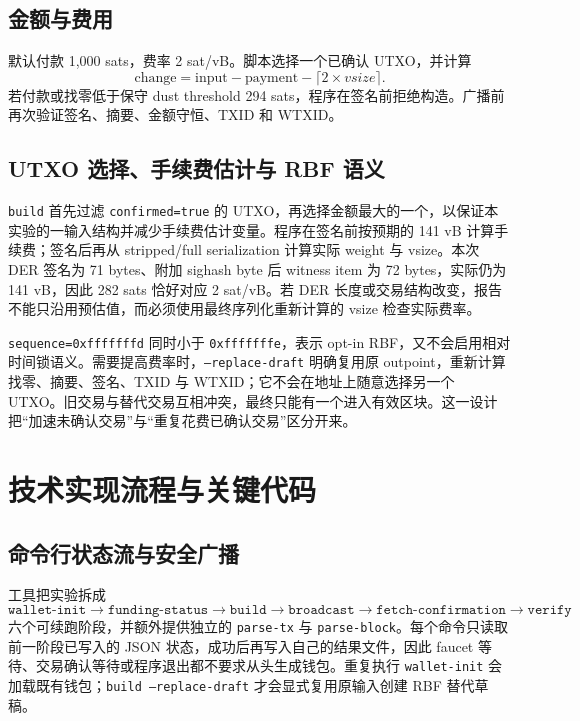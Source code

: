 \documentclass[11pt,a4paper,fontset=none]{ctexart}
\begin{document}
\subsection{金额与费用}

默认付款 1,000 sats，费率 2 sat/vB。脚本选择一个已确认 UTXO，并计算
\[
\text{change}=\text{input}-\text{payment}-\lceil 2\times vsize\rceil.
\]
若付款或找零低于保守 dust threshold 294 sats，程序在签名前拒绝构造。广播前再次验证签名、摘要、金额守恒、TXID 和 WTXID。

\subsection{UTXO 选择、手续费估计与 RBF 语义}

\texttt{build} 首先过滤 \texttt{confirmed=true} 的 UTXO，再选择金额最大的一个，以保证本实验的一输入结构并减少手续费估计变量。程序在签名前按预期的 141 vB 计算手续费；签名后再从 stripped/full serialization 计算实际 weight 与 vsize。本次 DER 签名为 71 bytes、附加 sighash byte 后 witness item 为 72 bytes，实际仍为 141 vB，因此 282 sats 恰好对应 2 sat/vB。若 DER 长度或交易结构改变，报告不能只沿用预估值，而必须使用最终序列化重新计算的 vsize 检查实际费率。

\texttt{sequence=0xfffffffd} 同时小于 \texttt{0xfffffffe}，表示 opt-in RBF，又不会启用相对时间锁语义。需要提高费率时，\texttt{--replace-draft} 明确复用原 outpoint，重新计算找零、摘要、签名、TXID 与 WTXID；它不会在地址上随意选择另一个 UTXO。旧交易与替代交易互相冲突，最终只能有一个进入有效区块。这一设计把“加速未确认交易”与“重复花费已确认交易”区分开来。



\section{技术实现流程与关键代码}

\subsection{命令行状态流与安全广播}

工具把实验拆成
\[
\texttt{wallet-init}\rightarrow\texttt{funding-status}\rightarrow
\texttt{build}\rightarrow\texttt{broadcast}\rightarrow
\texttt{fetch-confirmation}\rightarrow\texttt{verify}
\]
六个可续跑阶段，并额外提供独立的 \texttt{parse-tx} 与 \texttt{parse-block}。每个命令只读取前一阶段已写入的 JSON 状态，成功后再写入自己的结果文件，因此 faucet 等待、交易确认等待或程序退出都不要求从头生成钱包。重复执行 \texttt{wallet-init} 会加载既有钱包；\texttt{build --replace-draft} 才会显式复用原输入创建 RBF 替代草稿。
\end{document}
